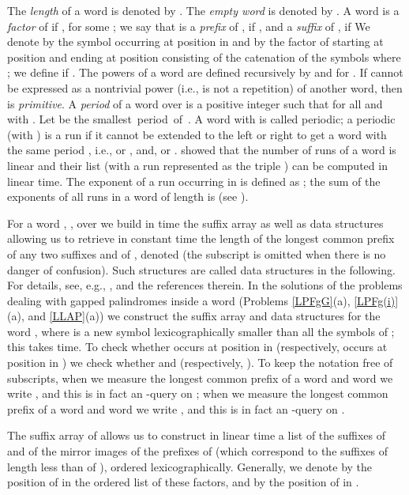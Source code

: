 \documentclass[final]{dmtcs-episciences}
\begin{document}
The \emph{length} of a word  is denoted by . The \emph{empty word} is denoted by . 
A word  is a \emph{factor} of  if , for some ; we say that  is a \emph{prefix} of , if , and a \emph{suffix} of , if 
We denote by  the symbol occurring at position  in  and by  the factor of  starting at position  and ending at position  consisting of the catenation of the symbols  where ; we define  if . The powers of a word  are defined recursively by  and   for . 
If  cannot be expressed as a nontrivial power (i.e.,  is not a repetition) of another word, then  is \emph{primitive}. 
A \emph{period} of a word  over  is a positive integer  such that  for all  and  with . Let  be the smallest~period~of~. A word  with  is called periodic; a periodic  (with ) is a run if it cannot be extended to the left or right to get a word with the same period , i.e.,  or ,
and,  or . \cite{KK99} showed that the number of runs of a word is linear and their list (with a run  represented as the triple ) can be computed in linear time.
The exponent of a run  occurring in  is defined as ; the sum of the exponents of all runs in a word of length  is  (see \cite{KK99}). 

For a word , , over  we build in  time the suffix array as well as data structures allowing us to retrieve in constant time the length of the longest common prefix of any two suffixes  and 
of , denoted  (the subscript  is omitted when there is no danger of confusion). Such structures are called  data structures in the following. For details, see, e.g., \cite{KaSaBu06,Gu97}, and the references therein. In the solutions of the problems dealing with gapped palindromes inside a word  (Problems \ref{LPFgG}(a), \ref{LPFg(i)}(a), and \ref{LLAP}(a)) we construct the suffix array and  data structures for 
the word , where  is a new symbol lexicographically smaller than all the symbols of ; this takes  time. To check whether  occurs at position  in  (respectively,  occurs at position  in ) we check whether  and  (respectively, ). To keep the notation free of subscripts, when we measure the longest common prefix of a word  and word  we write , and this is in fact an -query on ; when we measure the longest common prefix of a word  and word  we write , and this is in fact an -query on .

The suffix array of  allows us to construct in linear time a list  of the suffixes  of  and of the mirror images  of the prefixes of  (which correspond to the suffixes of length less than  of ), ordered lexicographically. Generally, we denote by  the position of  in the ordered list  of these factors, and by  the position of  in . 
\end{document}
